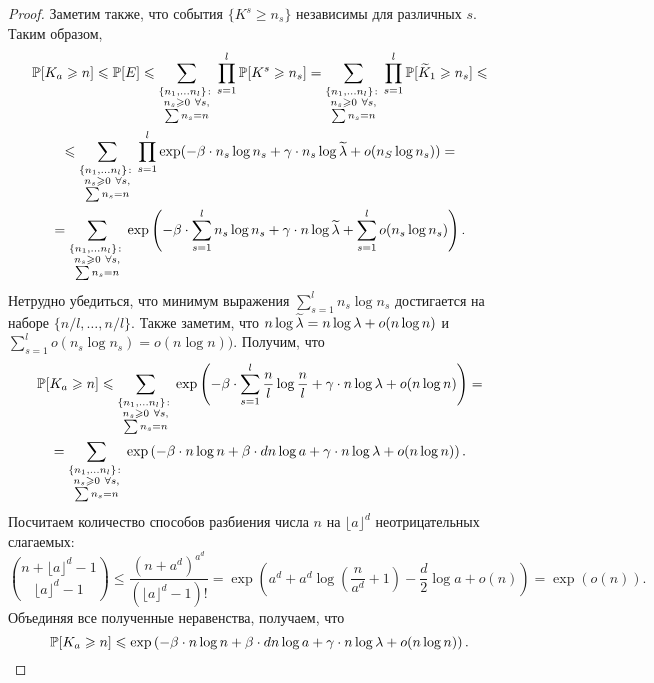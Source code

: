 \begin{proof}
Заметим также, что события $\{K^s \geq n_s\}$ независимы для различных $s$.\\
Таким образом,
\begin{multline*}
    \mathbb{P}[K_a\geqslant n] \leqslant
    \mathbb{P}[E] \leqslant 
    \sum_{\substack{\{n_1, \ldots n_l\}\colon\\ n_s \geqslant 0\ \forall s,\\ \sum n_s = n}}\prod_{s=1}^l\mathbb{P}[K^s\geqslant n_s] =
    \sum_{\substack{\{n_1, \ldots n_l\}\colon\\ n_s \geqslant 0\ \forall s,\\ \sum n_s = n}}\prod_{s=1}^l\mathbb{P}[\widetilde K_1\geqslant n_s]\leqslant \\
    \leqslant \sum_{\substack{\{n_1, \ldots n_l\}\colon\\ n_s \geqslant 0\ \forall s,\\ \sum n_s = n}}\prod_{s=1}^l \exp(-\beta\cdot n_s\log n_s + \gamma\cdot n_s\log\widetilde\lambda + o(n_S\log n_s)) =\\
    =\sum_{\substack{\{n_1, \ldots n_l\}\colon\\ n_s \geqslant 0\ \forall s,\\ \sum n_s = n}}\exp\left(-\beta\cdot \sum_{s=1}^l n_s\log n_s + \gamma\cdot n\log\widetilde\lambda + \sum_{s=1}^l o(n_s\log n_s)\right).
    \end{multline*}
Нетрудно убедиться, что минимум выражения $\sum_{s=1}^l n_s\log n_s$ достигается на наборе $\{n/l, \ldots, n/l\}$. Также заметим, что $n\log\widetilde\lambda = n\log\lambda + o(n\log n)$ и $\sum_{s=1}^lo(n_s\log n_s) = o(n\log n))$. Получим, что
    \begin{multline*}
    \mathbb{P}[K_a\geqslant n]\leqslant
    \sum_{\substack{\{n_1, \ldots n_l\}\colon\\ n_s \geqslant 0\ \forall s,\\ \sum n_s = n}}\exp\left(-\beta\cdot \sum_{s=1}^l \dfrac{n}{l}\log\dfrac{n}{l} + \gamma\cdot n\log\lambda + o(n\log n)\right) = \\
    =\sum_{\substack{\{n_1, \ldots n_l\}\colon\\ n_s \geqslant 0\ \forall s,\\ \sum n_s = n}}\exp\left(-\beta\cdot n\log n + \beta\cdot dn\log a + \gamma\cdot n\log\lambda + o(n\log n)\right).
    \end{multline*}
Посчитаем количество способов разбиения числа $n$ на $\lfloor a\rfloor^d$ неотрицательных слагаемых:
\begin{equation*}
    \binom{n + \lfloor a\rfloor^d - 1}{\lfloor a\rfloor^d - 1} \leq \dfrac{(n + a^d)^{a^d}}{(\lfloor a\rfloor^d -1)!} = \exp\left(a^d + a^d\log\left(\dfrac{n}{a^d}+1\right) - \dfrac{d}{2} \log a + o(n)\right) = \exp(o(n)).
\end{equation*}{}
Объединяя все полученные неравенства, получаем, что 
\begin{equation*}
    \mathbb{P}[K_a\geqslant n]\leqslant
    \exp\left(-\beta\cdot n\log n + \beta\cdot dn\log a + \gamma\cdot n\log\lambda + o(n\log n) \right).
\end{equation*}{}
\end{proof}{}

